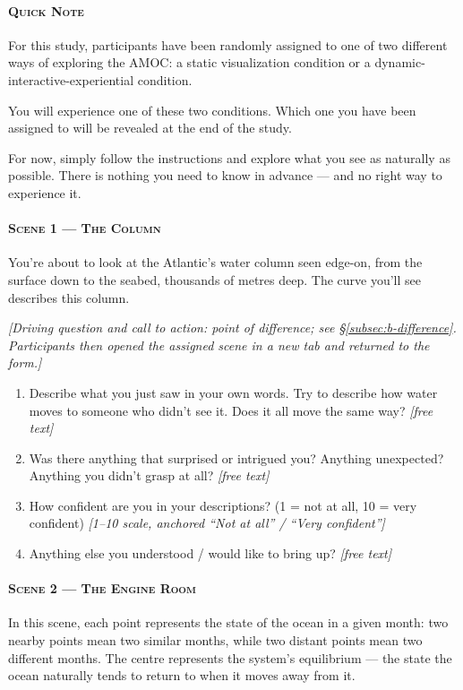 \paragraph{\textsc{Quick Note}}
For this study, participants have been randomly assigned to one of two different ways of
exploring the AMOC: a static visualization condition or a dynamic-interactive-experiential
condition.

You will experience one of these two conditions. Which one you have been assigned to will be
revealed at the end of the study.

For now, simply follow the instructions and explore what you see as naturally as possible.
There is nothing you need to know in advance --- and no right way to experience it.

\paragraph{\textsc{Scene 1 --- The Column}}
You're about to look at the Atlantic's water column seen edge-on, from the surface down to the
seabed, thousands of metres deep. The curve you'll see describes this column.

\emph{[Driving question and call to action: point of difference; see
\S\ref{subsec:b-difference}. Participants then opened the assigned scene in a new tab and
returned to the form.]}

\begin{enumerate}[leftmargin=2.2em, itemsep=3pt, start=7]
\item Describe what you just saw in your own words. Try to describe how water moves to someone
      who didn't see it. Does it all move the same way? \emph{[free text]}
\item Was there anything that surprised or intrigued you? Anything unexpected? Anything you
      didn't grasp at all? \emph{[free text]}
\item How confident are you in your descriptions? (1 = not at all, 10 = very confident)
      \emph{[1--10 scale, anchored ``Not at all'' / ``Very confident'']}
\item Anything else you understood / would like to bring up? \emph{[free text]}
\end{enumerate}

\paragraph{\textsc{Scene 2 --- The Engine Room}}
In this scene, each point represents the state of the ocean in a given month: two nearby points
mean two similar months, while two distant points mean two different months. The centre
represents the system's equilibrium --- the state the ocean naturally tends to return to when
it moves away from it.

